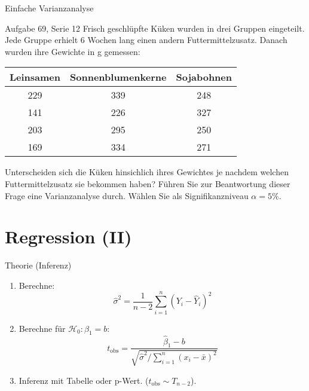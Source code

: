 \documentclass[handout]{beamer}
\begin{document}
\begin{frame}{Einfache Varianzanalyse}
\begin{beamerboxesrounded}[shadow]{Aufgabe 69, Serie 12}
Frisch geschlüpfte Küken wurden in drei Gruppen eingeteilt. Jede Gruppe erhielt 6 
Wochen lang einen andern Futtermittelzusatz. Danach wurden ihre Gewichte in g gemessen:

\vspace{2mm}\begin{center}{\scriptsize\begin{tabular}{ccc}\toprule
Leinsamen & Sonnenblumenkerne & Sojabohnen\\\midrule
229 & 339 & 248\\
141 & 226 & 327\\
203 & 295 & 250\\
169 & 334 & 271\\
\bottomrule
\end{tabular}}\end{center}\vspace{2mm}

Unterscheiden sich die Küken hinsichlich ihres Gewichtes je nachdem welchen Futtermittelzusatz
sie bekommen haben? Führen Sie zur Beantwortung dieser Frage eine Varianzanalyse
durch. Wählen Sie als Signifikanzniveau $\alpha = 5\%$.
\end{beamerboxesrounded}
\end{frame}

\section{Regression (II)}

\begin{frame}{Theorie (Inferenz)}
\begin{enumerate}
\item Berechne:
$$
\hat{\sigma}^2 = \frac{1}{n-2}\sum_{i=1}^n (Y_i-\hat{Y}_i)^2
$$
\item Berechne für $\mathcal{H}_0: \beta_1=b$:
$$
t_\text{obs}=\frac{\hat\beta_1-b}{\sqrt{\hat\sigma^2/\sum_{i=1}^n(x_i-\bar{x})^2}}
$$
\item Inferenz mit Tabelle oder p-Wert. ($t_\text{obs}\sim T_{n-2}$).
\end{enumerate}
\end{frame}
\end{document}
